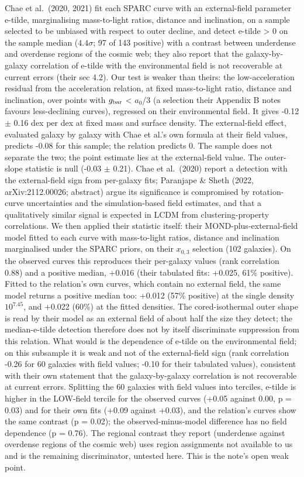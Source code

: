 \documentclass[
  10pt,
]{article}
\begin{document}
Chae et al.~(2020, 2021) fit each SPARC curve with an external-field
parameter e-tilde, marginalising mass-to-light ratios, distance and
inclination, on a sample selected to be unbiased with respect to outer
decline, and detect e-tilde \textgreater{} 0 on the sample median ($4.4\sigma$; 97 of 143 positive) with a contrast between underdense and
overdense regions of the cosmic web; they also report that the
galaxy-by-galaxy correlation of e-tilde with the environmental field is
not recoverable at current errors (their sec 4.2). Our test is weaker
than theirs: the low-acceleration residual from the acceleration
relation, at fixed mass-to-light ratio, distance and inclination, over
points with $g_{\rm bar}$ \textless{} $a_0$/3 (a selection their Appendix B notes
favours less-declining curves), regressed on their environmental field.
It gives -0.12 $\pm$ 0.16 dex per dex at fixed mass and surface density.
The external-field effect, evaluated galaxy by galaxy with Chae et al.'s
own formula at their field values, predicts -0.08 for this sample; the
relation predicts 0. The sample does not separate the two; the point estimate
lies at the external-field value. The outer-slope statistic is null
(-0.03 $\pm$ 0.21). Chae et al.~(2020) report a detection with the
external-field sign from per-galaxy fits; Paranjape \& Sheth (2022,
arXiv:2112.00026; abstract) argue its significance is compromised by
rotation-curve uncertainties and the simulation-based field estimates,
and that a qualitatively similar signal is expected in LCDM from
clustering-property correlations. We then applied their statistic
itself: their MOND-plus-external-field model fitted to each curve with
mass-to-light ratios, distance and inclination marginalised under the
SPARC priors, on their $x_{0,3}$ selection (102 galaxies). On the observed
curves this reproduces their per-galaxy values (rank correlation 0.88)
and a positive median, +0.016 (their tabulated fits: +0.025, 61\%
positive). Fitted to the relation's own curves, which contain no external
field, the same model returns a positive median too: +0.012 (57\%
positive) at the single density $10^{7.45}$, and +0.022 (60\%) at the
fitted densities. The cored-isothermal outer shape is read by their
model as an external field of about half the size they detect; the
median-e-tilde detection therefore does not by itself discriminate
suppression from this relation. What would is the dependence of e-tilde on
the environmental field; on this subsample it is weak and not of the
external-field sign (rank correlation -0.26 for 60 galaxies with field
values; -0.10 for their tabulated values), consistent with their own
statement that the galaxy-by-galaxy correlation is not recoverable at
current errors. Splitting the 60 galaxies with field values into
terciles, e-tilde is higher in the LOW-field tercile for the observed
curves (+0.05 against 0.00, p = 0.03) and for their own fits (+0.09
against +0.03), and the relation's curves show the same contrast (p = 0.02);
the observed-minus-model difference has no field dependence (p = 0.76).
The regional contrast they report (underdense against overdense regions
of the cosmic web) uses region assignments not available to us and is
the remaining discriminator, untested here. This is the note's open weak
point.
\end{document}
